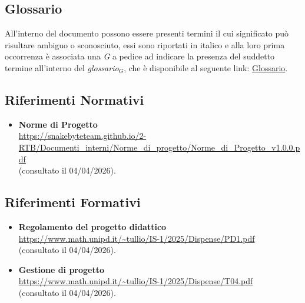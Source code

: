 \documentclass[10pt, letterpaper]{article}
\begin{document}
\subsection{Glossario}
All'interno del documento possono essere presenti termini il cui significato può risultare ambiguo o sconosciuto, essi sono
riportati in italico e alla loro prima occorrenza è associata una \textit{G} a pedice ad indicare la presenza del suddetto termine all'interno del \texorpdfstring{\textit{glossario$_G$}}{glossario}, che è disponibile al seguente link: \href{https://snakebyteteam.github.io/glossary.html}{Glossario}.

\subsection{Riferimenti Normativi}
\begin{itemize}
    \item \textbf{Norme di Progetto}
          \\ \url{https://snakebyteteam.github.io/2-RTB/Documenti_interni/Norme_di_progetto/Norme_di_Progetto_v1.0.0.pdf}
          \\ (consultato il 04/04/2026).
\end{itemize}

\subsection{Riferimenti Formativi}
\begin{itemize}
    \item \textbf{Regolamento del progetto didattico}\\
          \url{https://www.math.unipd.it/~tullio/IS-1/2025/Dispense/PD1.pdf}
          \\ (consultato il 04/04/2026).
    \item \textbf{Gestione di progetto}\\
          \url{https://www.math.unipd.it/~tullio/IS-1/2025/Dispense/T04.pdf}
          \\ (consultato il 04/04/2026).
\end{itemize}
\end{document}
